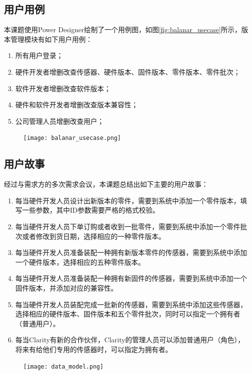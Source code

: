 \subsection{用户用例}
本课题使用Power Designer绘制了一个用例图，如图\ref{fig:balanar_usecase}所示，版本管理模块有如下用户用例：
\begin{enumerate}
  \item 所有用户登录；
  \item 硬件开发者增删改查传感器、硬件版本、固件版本、零件版本、零件批次；
  \item 软件开发者增删改查软件版本；
  \item 硬件和软件开发者增删改查版本兼容性；
  \item 公司管理人员增删改查用户；
\end{enumerate}
\begin{figure}[!htp]
 \centering
 \texttt{[image: balanar\_usecase.png]}
\end{figure}
\subsection{用户故事}
经过与需求方的多次需求会议，本课题总结出如下主要的用户故事：
\begin{enumerate}
  \item 每当硬件开发人员设计出新版本的零件，需要到系统中添加一个零件版本，填写一些参数，其中ID参数需要严格的格式校验。
  \item 每当硬件开发人员下单订购或者收到一批零件，需要到系统中添加一个零件批次或者修改到货日期，选择相应的一种零件版本。
  \item 每当硬件开发人员准备装配一种拥有新版本零件的传感器，需要到系统中添加一个硬件版本，选择相应的五种零件版本。
  \item 每当硬件开发人员准备装配一种拥有新固件的传感器，需要到系统中添加一个固件版本，并添加对应的兼容性。
  \item 每当硬件开发人员装配完成一批新的传感器，需要到系统中添加这些传感器，选择相应的硬件版本、固件版本和五个零件批次，同时可以指定一个拥有者（普通用户）。
  \item 每当Clarity有新的合作伙伴，Clarity的管理人员可以添加普通用户（角色），将来有给他们专用的传感器时，可以指定为拥有者。
\end{enumerate}
\begin{figure}[H]
 \centering
 \texttt{[image: data\_model.png]}
\end{figure}
